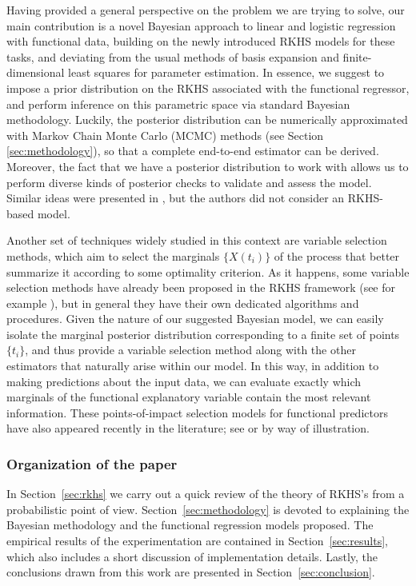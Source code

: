 \documentclass[ba]{imsart}
\numberwithin{equation}{section}
\theoremstyle{plain}
\begin{document}
Having provided a general perspective on the problem we are trying to solve, our main contribution is a novel Bayesian approach to linear and logistic regression with functional data, building on the newly introduced RKHS models for these tasks, and deviating from the usual methods of basis expansion and finite-dimensional least squares for parameter estimation. In essence, we suggest to impose a prior distribution on the RKHS associated with the functional regressor, and perform inference on this parametric space via standard Bayesian methodology. Luckily, the posterior distribution can be numerically approximated with Markov Chain Monte Carlo (MCMC) methods (see Section \ref{sec:methodology}), so that a complete end-to-end estimator can be derived. Moreover, the fact that we have a posterior distribution to work with allows us to perform diverse kinds of posterior checks to validate and assess the model. Similar ideas were presented in \citet{grollemund2019bayesian}, but the authors did not consider an RKHS-based model.

Another set of techniques widely studied in this context are variable selection methods, which aim to select the marginals \(\{X(t_i)\}\) of the process that better summarize it according to some optimality criterion. As it happens, some variable selection methods have already been proposed in the RKHS framework (see for example \citet{berrendero2019rkhs}), but in general they have their own dedicated algorithms and procedures. Given the nature of our suggested Bayesian model, we can easily isolate the marginal posterior distribution corresponding to a finite set of points \(\{t_i\}\), and thus provide a variable selection method along with the other estimators that naturally arise within our model. In this way, in addition to making predictions about the input data, we can evaluate exactly which marginals of the functional explanatory variable contain the most relevant information. These points-of-impact selection models for functional predictors have also appeared recently in the literature; see \citet{poss2020superconsistent} or \citet{ferraty2010most} by way of illustration.

\subsubsection{Organization of the paper}

In Section~\ref{sec:rkhs} we carry out a quick review of the theory of RKHS's from a probabilistic point of view. Section~\ref{sec:methodology} is devoted to explaining the Bayesian methodology and the functional regression models proposed. The empirical results of the experimentation are contained in Section~\ref{sec:results}, which also includes a short discussion of implementation details. Lastly, the conclusions drawn from this work are presented in Section~\ref{sec:conclusion}.
\end{document}
